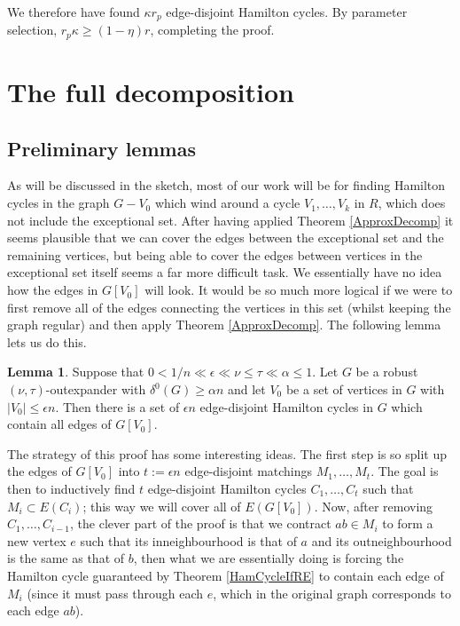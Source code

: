 \documentclass[10pt,letterpaper, reqno]{amsart}
\theoremstyle{definition}
\newtheorem{lemma}[thm]{Lemma}
\numberwithin{equation}{section}
\begin{document}
We therefore have found $\kappa r_p$ edge-disjoint Hamilton cycles. By parameter selection, $r_p\kappa \geq (1-\eta)r$, completing the proof.

\section{The full decomposition}\label{Full}


\subsection{Preliminary lemmas} As will be discussed in the sketch,  most of our work will be for finding Hamilton cycles in the graph $G-V_0$ which wind around a cycle $V_1,\dots,V_k$ in $R$, which does not include the exceptional set. After having applied Theorem \ref{ApproxDecomp} it seems plausible that we can cover the edges between the exceptional set and the remaining vertices, but being able to cover the edges between vertices in the exceptional set itself seems a far more difficult task. We essentially have no idea how the edges in $G[V_0]$ will look. It would be so much more logical if we were to first remove all of the edges connecting the vertices in this set (whilst keeping the graph regular) and then apply Theorem \ref{ApproxDecomp}. The following lemma lets us do this.
\begin{lemma}\label{11.1}
	Suppose that $0 < 1/n \ll \epsilon \ll \nu \leq \tau \ll \alpha \leq 1$. Let $G$ be a robust $(\nu, \tau)$-outexpander with $\delta^0(G) \geq \alpha n$ and let $V_0$ be a set of vertices in $G$ with $|V_0|\leq \epsilon n$. Then there is a set of $\epsilon n$ edge-disjoint Hamilton cycles in $G$ which contain all edges of $G[V_0]$.
\end{lemma}

\noindent The strategy of this proof has some interesting ideas. The first step is so split up the edges of $G[V_0]$ into $t:=\epsilon n$ edge-disjoint matchings $M_1, \dots, M_t$. The goal is then to inductively find $t$ edge-disjoint Hamilton cycles $C_1, \dots, C_t$ such that $M_i \subset E(C_i)$; this way we will cover all of $E(G[V_0])$. Now, after removing $C_1, \dots, C_{i-1}$, the clever part of the proof is that we contract $ab \in M_i$ to form a new vertex $e$ such that its inneighbourhood is that of $a$ and its outneighbourhood is the same as that of $b$, then what we are essentially doing is forcing the Hamilton cycle guaranteed by Theorem \ref{HamCycleIfRE} to contain each edge of $M_i$ (since it must pass through each $e$, which in the original graph corresponds to each edge $ab$).
\end{document}

